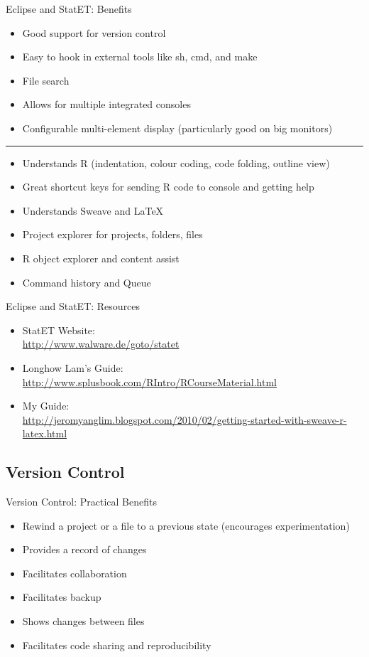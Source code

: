 \begin{frame}{Eclipse and StatET: Benefits}
\begin{itemize}
  \item Good support for version control
  \item Easy to hook in external tools like sh, cmd, and make
  \item File search
  \item Allows for multiple integrated consoles
  \item Configurable multi-element display (particularly good on big monitors)
\end{itemize}
\hrule
\begin{itemize}
  \item Understands R (indentation, colour coding, code folding, outline view) 
  \item Great shortcut keys for sending R code to console and getting help
  \item Understands Sweave and LaTeX
  \item Project explorer for projects, folders, files
  \item R object explorer and content assist
  \item Command history and Queue
\end{itemize}
\end{frame}

 


\begin{frame}{Eclipse and StatET: Resources}
\begin{itemize}
  \item StatET Website: \\
  {\tiny\url{http://www.walware.de/goto/statet}}
  \item Longhow Lam's Guide: \\ 
  {\tiny \url{http://www.splusbook.com/RIntro/RCourseMaterial.html}}
  \item My Guide: \\
   {\tiny \url{http://jeromyanglim.blogspot.com/2010/02/getting-started-with-sweave-r-latex.html}}
\end{itemize}
\end{frame}


\subsection{Version Control}
\begin{frame}{Version Control: Practical Benefits}
\begin{itemize}
\item Rewind a project or a file to a previous state (encourages experimentation)
\item Provides a record of changes
\item Facilitates collaboration
\item Facilitates backup
\item Shows changes between files
\item Facilitates code sharing and reproducibility
\end{itemize}
\end{frame}

